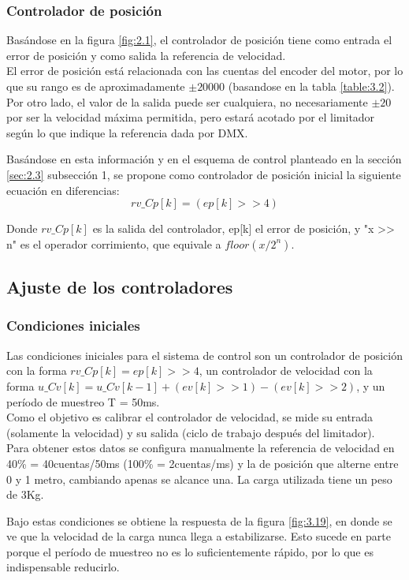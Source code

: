 \subsubsection{Controlador de posición}
Basándose en la figura \ref{fig:2.1}, el controlador de posición tiene como entrada el error de posición y como salida la referencia de velocidad. \\
El error de posición está relacionada con las cuentas del encoder del motor, por lo que su rango es de aproximadamente \(\pm 20000\) (basandose en la tabla \ref{table:3.2}). Por otro lado, el valor de la salida puede ser cualquiera, no necesariamente \(\pm 20\) por ser la velocidad máxima permitida, pero estará acotado por el limitador según lo que indique la referencia dada por DMX.

Basándose en esta información y en el esquema de control planteado en la sección \ref{sec:2.3} subsección 1, se propone como controlador de posición inicial la siguiente ecuación en diferencias:
\[rv\_Cp[k] = (ep[k] >> 4)\]

Donde \(rv\_Cp[k]\) es la salida del controlador, ep[k] el error de posición, y "x >> n" es el operador corrimiento, que equivale a \(floor(x/2^n)\).

\subsection{Ajuste de los controladores}


\subsubsection{Condiciones iniciales}
Las condiciones iniciales para el sistema de control son un controlador de posición con la forma \(rv\_Cp[k] = ep[k] >> 4\), un controlador de velocidad con la forma \(u\_Cv[k] = u\_Cv[k-1] + (ev[k] >> 1) - (ev[k] >> 2)\), y un período de muestreo T = 50ms.\\

Como el objetivo es calibrar el controlador de velocidad, se mide su entrada (solamente la velocidad) y su salida (ciclo de trabajo después del limitador). \\
Para obtener estos datos se configura manualmente la referencia de velocidad en 40\% = 40cuentas/50ms (100\% = 2cuentas/ms) y la de posición que alterne entre 0 y 1 metro, cambiando apenas se alcance una. La carga utilizada tiene un peso de 3Kg.

Bajo estas condiciones se obtiene la respuesta de la figura \ref{fig:3.19}, en donde se ve que la velocidad de la carga nunca llega a estabilizarse. Esto sucede en parte porque el período de muestreo no es lo suficientemente rápido, por lo que es indispensable reducirlo.

